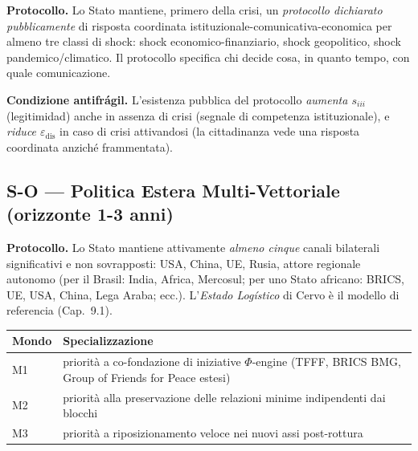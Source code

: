 \Hypoth{} \textbf{Protocollo.} Lo Stato mantiene, primero della crisi, un
\emph{protocollo dichiarato pubblicamente} di risposta coordinata
istituzionale-comunicativa-economica per almeno tre classi di shock:
shock economico-finanziario, shock geopolitico, shock
pandemico/climatico. Il protocollo specifica chi decide cosa, in quanto
tempo, con quale comunicazione.

\Proved{} \textbf{Condizione antifrágil.} L'esistenza pubblica del
protocollo \emph{aumenta \(s_{iii}\)} (legitimidad) anche in assenza di
crisi (segnale di competenza istituzionale), e \emph{riduce
\(\varepsilon_{\text{dis}}\)} in caso di crisi attivandosi (la
cittadinanza vede una risposta coordinata anziché frammentata).

\subsection{S-O --- Politica Estera Multi-Vettoriale (orizzonte 1-3
anni)}\label{s-o-politica-estera-multi-vettoriale-orizzonte-1-3-anni}

\Hypoth{} \textbf{Protocollo.} Lo Stato mantiene attivamente
\emph{almeno cinque} canali bilaterali significativi e non sovrapposti:
USA, China, UE, Rusia, attore regionale autonomo (per il Brasil: India,
Africa, Mercosul; per uno Stato africano: BRICS, UE, USA, China, Lega
Araba; ecc.). L'\emph{Estado Logístico} di Cervo è il modello di
referencia (Cap.~9.1).

{\def\LTcaptype{none} %
{\small\begin{longtable}[]{@{}
  >{\raggedright\arraybackslash}p{}
  >{\raggedright\arraybackslash}p{}@{}}
\toprule\noalign{}
\begin{minipage}[b]{\linewidth}\raggedright
Mondo
\end{minipage} & \begin{minipage}[b]{\linewidth}\raggedright
Specializzazione
\end{minipage} \\
\midrule\noalign{}
\endhead
\bottomrule\noalign{}
\endlastfoot
M1 & priorità a co-fondazione di iniziative \(\Phi\)-engine (TFFF, BRICS
BMG, Group of Friends for Peace estesi) \\
M2 & priorità alla preservazione delle relazioni minime indipendenti dai
blocchi \\
M3 & priorità a riposizionamento veloce nei nuovi assi post-rottura \\
\end{longtable}}
}


